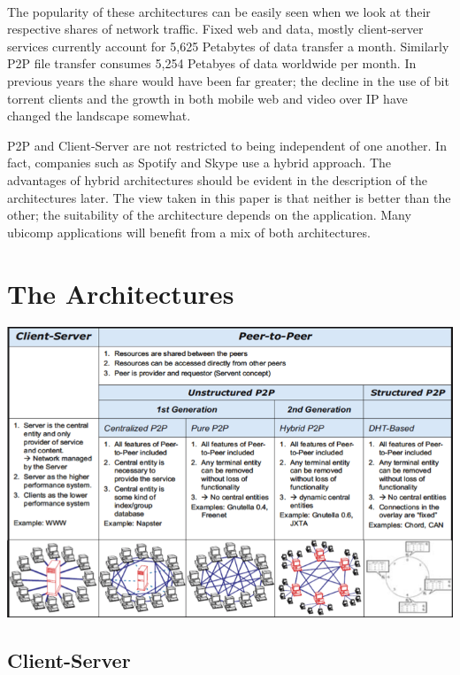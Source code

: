\documentclass[11pt]{amsart}
\begin{document}
\paragraph{}
The popularity of these architectures can be easily seen when we look at their respective shares of network traffic.  
Fixed web and data, mostly client-server services currently account for 5,625 Petabytes of data transfer a month. Similarly P2P file transfer consumes 5,254 Petabyes of data worldwide per month.\cite{Cisco} In previous years the share would have been far greater; the decline in the use of bit torrent clients and the growth in both mobile web and video over IP have changed the landscape somewhat.

P2P and Client-Server are not restricted to being independent of one another. In fact, companies such as Spotify and Skype use a hybrid approach. The advantages of hybrid architectures should be evident in the description of the architectures later. The view taken in this paper is that neither is better than the other; the suitability of the architecture depends on the application. Many ubicomp applications will benefit from a mix of both architectures.

\section{The Architectures\cite{DistSys}}

\includegraphics[scale=.5]{Architectures}\cite{eberspacher20055}

\subsection{Client-Server}
\end{document}
